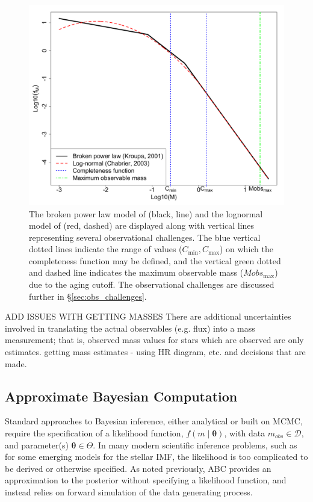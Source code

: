 \documentclass[12pt]{article}
\newcommand{\btheta}{\boldsymbol{\theta}}
\begin{document}
\begin{figure}[htbp]
   \centering
\includegraphics[width = .55\textwidth]{figures/CompareOthers2.pdf} 
   \caption{The broken power law model of \cite{kroupa2001} (black, line) and the lognormal model of \cite{chabrier2005} (red, dashed) are displayed along with vertical lines representing several observational challenges.  The blue vertical dotted lines indicate the range of values ($C_{\min}, C_{\max}$) on which the completeness function may be defined, and the vertical green dotted and dashed line indicates the maximum observable mass ($Mobs_{\max}$) due to the aging cutoff.  The observational challenges are discussed further in \S\ref{sec:obs_challenges}.}
   \label{fig:imf_models}
\end{figure}



{\color{red} ADD ISSUES WITH GETTING MASSES}  There are additional uncertainties involved in translating the actual observables  (e.g. flux) into a mass measurement; that is, observed mass values for stars which are observed are only estimates.  {\color{red} getting mass estimates - using HR diagram, etc. and decisions that are made.}


\subsection{Approximate Bayesian Computation}

Standard approaches to Bayesian inference, either analytical or built on
MCMC, require the specification of a
likelihood function, $f(m \mid \btheta)$, with data $m_{obs} \in \mathcal D$, 
and parameter(s) $\btheta \in \Theta$. In many modern scientific inference 
problems, such as for some emerging models for the stellar IMF, the likelihood is too complicated to be derived or otherwise
specified. 
As noted previously, ABC provides an approximation to the posterior
without specifying a likelihood function, and instead relies on forward simulation of the data generating
process.
\end{document}
